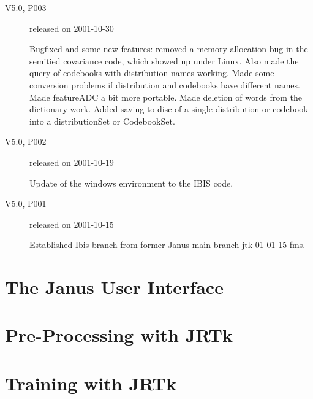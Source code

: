 \documentclass[a4paper,twoside]{book}
\begin{document}
\begin{description}
\item[V5.0, P003] released on 2001-10-30

  Bugfixed and some new features:
  removed a memory allocation bug in the
  semitied covariance code, which showed up under Linux.
  Also made the query of codebooks with distribution names
  working. Made some conversion problems if distribution
  and codebooks have different names.
  Made featureADC a bit more portable.
  Made deletion of words from the dictionary work.
  Added saving to disc of a single distribution or codebook
  into a distributionSet or CodebookSet.

\item[V5.0, P002] released on 2001-10-19

  Update of the windows environment to the IBIS code.

\item[V5.0, P001] released on 2001-10-15

  Established Ibis branch from former Janus main branch jtk-01-01-15-fms.

\end{description}


\chapter{The Janus User Interface} \label{sec:interface}





\chapter{Pre-Processing with JRTk} \label{sec:frontend}



\chapter{Training with JRTk} \label{sec:training}
\end{document}
